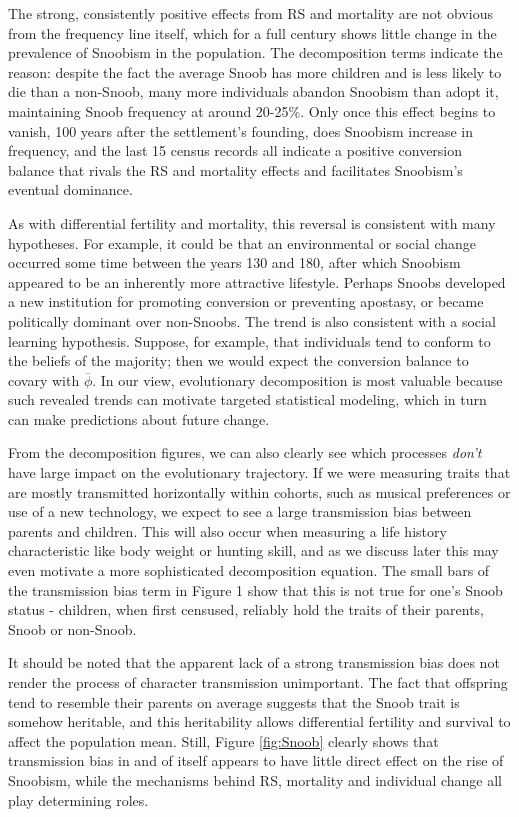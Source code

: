 \documentclass[11pt]{article}
\begin{document}
The strong, consistently positive effects from RS and mortality are not obvious from the frequency line itself, which for a full century shows little change in the prevalence of Snoobism in the population.  The decomposition terms indicate the reason: despite the fact the average Snoob has more children and is less likely to die than a non-Snoob, many more individuals abandon Snoobism than adopt it, maintaining Snoob frequency at around 20-25\%.  Only once this effect begins to vanish, 100 years after the settlement's founding, does Snoobism increase in frequency, and the last 15 census records all indicate a positive conversion balance that rivals the RS and mortality effects and facilitates Snoobism's eventual dominance.  

As with differential fertility and mortality, this reversal is consistent with many hypotheses. For example, it could be that an environmental or social change occurred some time between the years 130 and 180, after which Snoobism appeared to be an inherently more attractive lifestyle. Perhaps Snoobs developed a new institution for promoting conversion or preventing apostasy, or became politically dominant over non-Snoobs.  The trend is also consistent with a social learning hypothesis. Suppose, for example, that individuals tend to conform to the beliefs of the majority; then we would expect the conversion balance to covary with $\overline{\phi}$.  In our view, evolutionary decomposition is most valuable because such revealed trends can motivate targeted statistical modeling, which in turn can make predictions about future change.  

From the decomposition figures, we can also clearly see which processes \textit{don't} have large impact on the evolutionary trajectory. If we were measuring traits that are mostly transmitted horizontally within cohorts, such as musical preferences or use of a new technology, we expect to see a large transmission bias between parents and children.  This will also occur when measuring a life history characteristic like body weight or hunting skill, and as we discuss later this may even motivate a more sophisticated decomposition equation. The small bars of the transmission bias term in Figure 1 show that this is not true for one's Snoob status - children, when first censused, reliably hold the traits of their parents, Snoob or non-Snoob.

It should be noted that the apparent lack of a strong transmission bias does not render the process of character transmission unimportant. The fact that offspring tend to resemble their parents on average suggests that the Snoob trait is somehow heritable, and this heritability allows differential fertility and survival to affect the population mean. Still, Figure \ref{fig:Snoob} clearly shows that transmission bias in and of itself appears to have little direct effect on the rise of Snoobism, while the mechanisms behind RS, mortality and individual change all play determining roles.  
\end{document}
